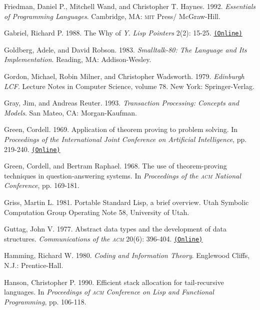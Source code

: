 \documentclass[oneside]{book}
\newcommand{\acronym}[1]{\textsc{\MakeLowercase{#1}}}
\newcommand{\code}[1]{\texttt{#1}}
\begin{document}
 \label{Friedman et al. 1992}
Friedman, Daniel P., Mitchell Wand, and Christopher T. Haynes. 1992.
\textit{Essentials of Programming Languages}.  Cambridge, MA: \acronym{MIT}
Press/ McGraw-Hill.

 \label{Gabriel 1988}
Gabriel, Richard P. 1988.  The Why of \emph{Y}.  \textit{Lisp Pointers}
2(2): 15-25.
\href{http://www.dreamsongs.com/Files/WhyOfY.pdf}{\code{(Online)}}

Goldberg, Adele, and David Robson.  1983.  \textit{Smalltalk-80: The Language and
Its Implementation}. Reading, MA: Addison-Wesley.

 \label{Gordon et al. 1979}
Gordon, Michael, Robin Milner, and Christopher Wadsworth.  1979.
\textit{Edinburgh LCF}. Lecture Notes in Computer Science, volume 78. New York:
Springer-Verlag.

 \label{Gray and Reuter 1993}
Gray, Jim, and Andreas Reuter. 1993. \textit{Transaction Processing: Concepts and
Models}. San Mateo, CA: Morgan-Kaufman.

 \label{Green 1969}
Green, Cordell.  1969.  Application of theorem proving to problem solving.  In
\textit{Proceedings of the International Joint Conference on Artificial
Intelligence}, pp. 219-240.
\href{http://citeseer.ist.psu.edu/viewdoc/summary?doi=10.1.1.81.9820}{\code{(Online)}}

 \label{Green and Raphael (1968)}
Green, Cordell, and Bertram Raphael.  1968.  The use of theorem-proving
techniques in question-answering systems.  In \textit{Proceedings of the
\acronym{ACM} National Conference}, pp. 169-181.

 \label{Griss 1981}
Griss, Martin L.  1981.  Portable Standard Lisp, a brief overview.  Utah
Symbolic Computation Group Operating Note 58, University of Utah.

 \label{Guttag 1977}
Guttag, John V.  1977.  Abstract data types and the development of data
structures.  \textit{Communications of the \acronym{ACM}} 20(6): 396-404.
\href{http://www.unc.edu/~stotts/comp723/guttagADT77.pdf}{\code{(Online)}}

 \label{Hamming 1980}
Hamming, Richard W.  1980.  \textit{Coding and Information Theory}.  Englewood
Cliffs, N.J.: Prentice-Hall.

 \label{Hanson 1990}
Hanson, Christopher P.  1990.  Efficient stack allocation for tail-recur\-sive
languages.  In \textit{Proceedings of \acronym{ACM} Conference on Lisp and
Functional Programming}, pp. 106-118.
\end{document}
